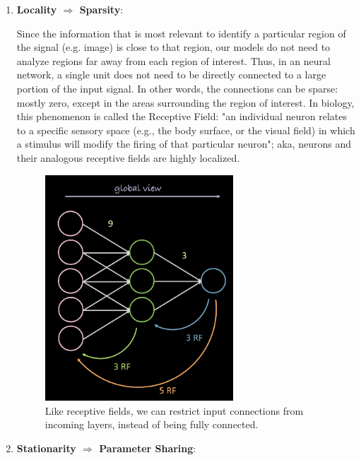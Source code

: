     \begin{enumerate}
        \item \textbf{Locality \(\Rightarrow\) Sparsity}: 
    
           Since the information that is most relevant to identify a particular region of the signal (e.g. image) is close to that region, our models do not need to analyze regions far away from each region of interest. 
           Thus, in an neural network, a single unit does not need to be directly connected to a large portion of the input signal. 
            In other words, the connections can be sparse: mostly zero, except in the areas surrounding the region of interest. 
            In biology, this phenomenon is called the Receptive Field: "an individual neuron relates to a specific sensory space (e.g., the body surface, or the visual field) in which a stimulus will modify the firing of that particular neuron"; aka, neurons and their analogous 
            receptive fields are highly localized.
            
            \begin{figure}[H]
            \begin{center}
            \includegraphics[width=200pt]{figs/sparsity.png}
            \end{center}
            \captionsetup{justification=centering, margin=2cm}
            \caption{Like receptive fields, we can restrict input connections from incoming layers, instead of being fully connected.}
            \end{figure}
        
        
        \item \textbf{Stationarity \(\Rightarrow\) Parameter Sharing}:
        

\end{enumerate}
